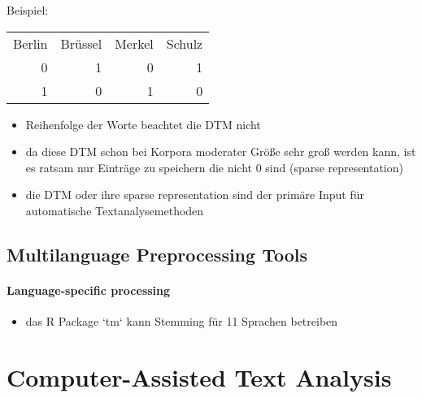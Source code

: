 \documentclass[11pt]{article}
\begin{document}
Beispiel:
\begin{center}
\begin{tabular}{rrrr}
Berlin & Brüssel & Merkel & Schulz\\
0 & 1 & 0 & 1\\
1 & 0 & 1 & 0\\
\end{tabular}
\end{center}

\begin{itemize}
\item Reihenfolge der Worte beachtet die DTM nicht
\item da diese DTM schon bei Korpora moderater Größe sehr groß werden kann, ist es ratsam nur Einträge zu speichern die nicht 0 sind (sparse representation)
\item die DTM oder ihre sparse representation sind der primäre Input für automatische Textanalysemethoden
\end{itemize}
\subsection{Multilanguage Preprocessing Tools}
\label{sec:orgd5b5e94}
\paragraph{Language-specific processing}

\begin{itemize}
\item das R Package `tm` kann Stemming für 11 Sprachen betreiben
\end{itemize}
\section{Computer-Assisted Text Analysis}
\label{sec:orgb301ae5}
\end{document}
